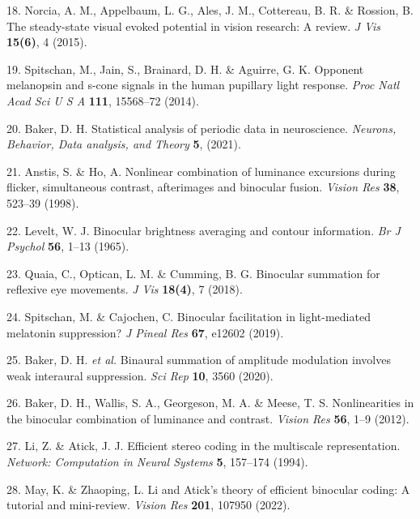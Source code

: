 \documentclass[
]{article}
\begin{document}
\leavevmode\hypertarget{ref-Norcia2015}{}%
18. Norcia, A. M., Appelbaum, L. G., Ales, J. M., Cottereau, B. R. \& Rossion, B. The steady-state visual evoked potential in vision research: A review. \emph{J Vis} \textbf{15(6)}, 4 (2015).

\leavevmode\hypertarget{ref-Spitschan2014}{}%
19. Spitschan, M., Jain, S., Brainard, D. H. \& Aguirre, G. K. Opponent melanopsin and s-cone signals in the human pupillary light response. \emph{Proc Natl Acad Sci U S A} \textbf{111}, 15568--72 (2014).

\leavevmode\hypertarget{ref-Baker2021}{}%
20. Baker, D. H. Statistical analysis of periodic data in neuroscience. \emph{Neurons, Behavior, Data analysis, and Theory} \textbf{5}, (2021).

\leavevmode\hypertarget{ref-Anstis1998}{}%
21. Anstis, S. \& Ho, A. Nonlinear combination of luminance excursions during flicker, simultaneous contrast, afterimages and binocular fusion. \emph{Vision Res} \textbf{38}, 523--39 (1998).

\leavevmode\hypertarget{ref-Levelt1965}{}%
22. Levelt, W. J. Binocular brightness averaging and contour information. \emph{Br J Psychol} \textbf{56}, 1--13 (1965).

\leavevmode\hypertarget{ref-Quaia2018}{}%
23. Quaia, C., Optican, L. M. \& Cumming, B. G. Binocular summation for reflexive eye movements. \emph{J Vis} \textbf{18(4)}, 7 (2018).

\leavevmode\hypertarget{ref-Spitschan2019}{}%
24. Spitschan, M. \& Cajochen, C. Binocular facilitation in light-mediated melatonin suppression? \emph{J Pineal Res} \textbf{67}, e12602 (2019).

\leavevmode\hypertarget{ref-Baker2020}{}%
25. Baker, D. H. \emph{et al.} Binaural summation of amplitude modulation involves weak interaural suppression. \emph{Sci Rep} \textbf{10}, 3560 (2020).

\leavevmode\hypertarget{ref-Baker2012}{}%
26. Baker, D. H., Wallis, S. A., Georgeson, M. A. \& Meese, T. S. Nonlinearities in the binocular combination of luminance and contrast. \emph{Vision Res} \textbf{56}, 1--9 (2012).

\leavevmode\hypertarget{ref-Li1994}{}%
27. Li, Z. \& Atick, J. J. Efficient stereo coding in the multiscale representation. \emph{Network: Computation in Neural Systems} \textbf{5}, 157--174 (1994).

\leavevmode\hypertarget{ref-May2022}{}%
28. May, K. \& Zhaoping, L. Li and Atick's theory of efficient binocular coding: A tutorial and mini-review. \emph{Vision Res} \textbf{201}, 107950 (2022).
\end{document}
